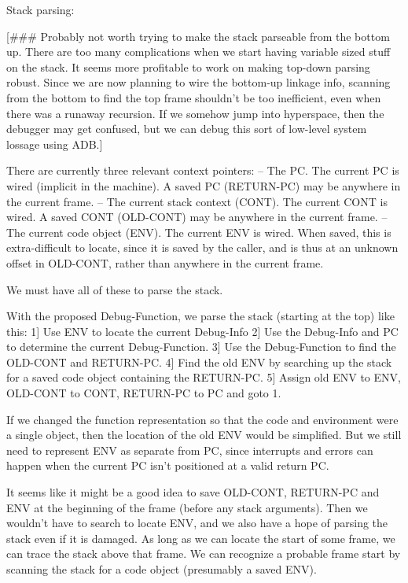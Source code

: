 Stack parsing:

[\#\#\# Probably not worth trying to make the stack parseable from the bottom up.
There are too many complications when we start having variable sized stuff on
the stack.  It seems more profitable to work on making top-down parsing robust.
Since we are now planning to wire the bottom-up linkage info, scanning from the
bottom to find the top frame shouldn't be too inefficient, even when there was
a runaway recursion.  If we somehow jump into hyperspace, then the debugger may
get confused, but we can debug this sort of low-level system lossage using
ADB.]


There are currently three relevant context pointers:
  -- The PC.  The current PC is wired (implicit in the machine).  A saved
     PC (RETURN-PC) may be anywhere in the current frame.
  -- The current stack context (CONT).  The current CONT is wired.  A saved
     CONT (OLD-CONT) may be anywhere in the current frame.
  -- The current code object (ENV).  The current ENV is wired.  When saved,
     this is extra-difficult to locate, since it is saved by the caller, and is
     thus at an unknown offset in OLD-CONT, rather than anywhere in the current
     frame.

We must have all of these to parse the stack.

With the proposed Debug-Function, we parse the stack (starting at the top) like
this:
 1] Use ENV to locate the current Debug-Info
 2] Use the Debug-Info and PC to determine the current Debug-Function.
 3] Use the Debug-Function to find the OLD-CONT and RETURN-PC.
 4] Find the old ENV by searching up the stack for a saved code object
    containing the RETURN-PC.
 5] Assign old ENV to ENV, OLD-CONT to CONT, RETURN-PC to PC and goto 1.

If we changed the function representation so that the code and environment were
a single object, then the location of the old ENV would be simplified.  But we
still need to represent ENV as separate from PC, since interrupts and errors
can happen when the current PC isn't positioned at a valid return PC.

It seems like it might be a good idea to save OLD-CONT, RETURN-PC and ENV at
the beginning of the frame (before any stack arguments).  Then we wouldn't have
to search to locate ENV, and we also have a hope of parsing the stack even if
it is damaged.  As long as we can locate the start of some frame, we can trace
the stack above that frame.  We can recognize a probable frame start by
scanning the stack for a code object (presumably a saved ENV).

